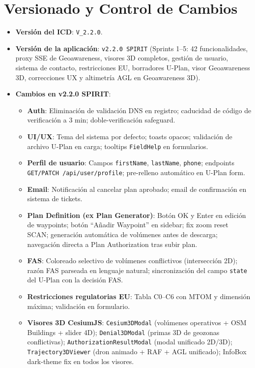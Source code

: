 \documentclass[12pt,a4paper]{article}
\begin{document}
\section{Versionado y Control de Cambios}
\begin{itemize}
    \item \textbf{Versión del ICD}: \texttt{V\_2.2.0}.
    \item \textbf{Versión de la aplicación}: \texttt{v2.2.0 SPIRIT} (Sprints 1--5: 42 funcionalidades, proxy SSE de Geoawareness, visores 3D completos, gestión de usuario, sistema de contacto, restricciones EU, borradores U-Plan, visor Geoawareness 3D, correcciones UX y altimetría AGL en Geoawareness 3D).
    \item \textbf{Cambios en v2.2.0 SPIRIT}:
    \begin{itemize}
        \item \textbf{Auth}: Eliminación de validación DNS en registro; caducidad de código de verificación a 3 min; doble-verificación safeguard.
        \item \textbf{UI/UX}: Tema del sistema por defecto; toasts opacos; validación de archivo U-Plan en carga; tooltips \texttt{FieldHelp} en formularios.
        \item \textbf{Perfil de usuario}: Campos \texttt{firstName}, \texttt{lastName}, \texttt{phone}; endpoints \texttt{GET/PATCH /api/user/profile}; pre-relleno automático en U-Plan form.
        \item \textbf{Email}: Notificación al cancelar plan aprobado; email de confirmación en sistema de tickets.
        \item \textbf{Plan Definition (ex Plan Generator)}: Botón OK y Enter en edición de waypoints; botón ``Añadir Waypoint'' en sidebar; fix zoom reset SCAN; generación automática de volúmenes antes de descarga; navegación directa a Plan Authorization tras subir plan.
        \item \textbf{FAS}: Coloreado selectivo de volúmenes conflictivos (intersección 2D); razón FAS parseada en lenguaje natural; sincronización del campo \texttt{state} del U-Plan con la decisión FAS.
        \item \textbf{Restricciones regulatorias EU}: Tabla C0--C6 con MTOM y dimensión máxima; validación en formulario.
        \item \textbf{Visores 3D CesiumJS}: \texttt{Cesium3DModal} (volúmenes operativos + OSM Buildings + slider 4D); \texttt{Denial3DModal} (primas 3D de geozonas conflictivas); \texttt{AuthorizationResultModal} (modal unificado 2D/3D); \texttt{Trajectory3DViewer} (dron animado + RAF + AGL unificado); InfoBox dark-theme fix en todos los visores.

\end{itemize}
\end{itemize}
\end{document}
